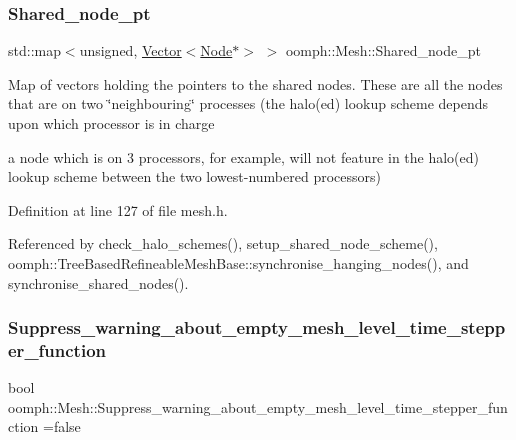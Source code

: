 \subsubsection{\texorpdfstring{Shared\+\_\+node\+\_\+pt}{Shared\_node\_pt}}
{\footnotesize\ttfamily std\+::map$<$unsigned, \hyperlink{classoomph_1_1Vector}{Vector}$<$\hyperlink{classoomph_1_1Node}{Node}$\ast$$>$ $>$ oomph\+::\+Mesh\+::\+Shared\+\_\+node\+\_\+pt\hspace{0.3cm}{\ttfamily [protected]}}

Map of vectors holding the pointers to the shared nodes. These are all the nodes that are on two \char`\"{}neighbouring\char`\"{} processes (the halo(ed) lookup scheme depends upon which processor is in charge
\begin{DoxyItemize}
\item a node which is on 3 processors, for example, will not feature in the halo(ed) lookup scheme between the two lowest-\/numbered processors) 
\end{DoxyItemize}

Definition at line 127 of file mesh.\+h.



Referenced by check\+\_\+halo\+\_\+schemes(), setup\+\_\+shared\+\_\+node\+\_\+scheme(), oomph\+::\+Tree\+Based\+Refineable\+Mesh\+Base\+::synchronise\+\_\+hanging\+\_\+nodes(), and synchronise\+\_\+shared\+\_\+nodes().

\mbox{\label{classoomph_1_1Mesh_ada6bc12304d1536b747596d1049e48be}} 
\subsubsection{\texorpdfstring{Suppress\+\_\+warning\+\_\+about\+\_\+empty\+\_\+mesh\+\_\+level\+\_\+time\+\_\+stepper\+\_\+function}{Suppress\_warning\_about\_empty\_mesh\_level\_time\_stepper\_function}}
{\footnotesize\ttfamily bool oomph\+::\+Mesh\+::\+Suppress\+\_\+warning\+\_\+about\+\_\+empty\+\_\+mesh\+\_\+level\+\_\+time\+\_\+stepper\+\_\+function =false\hspace{0.3cm}{\ttfamily [static]}}



